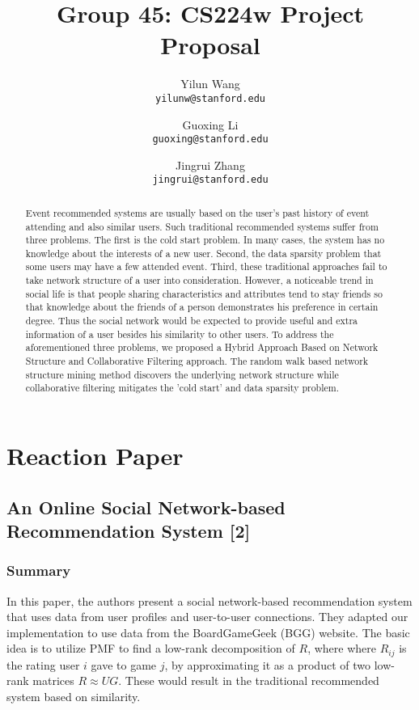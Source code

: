 \documentclass{article}
\begin{document}
\title{Group 45: CS224w Project Proposal}
\author{Yilun Wang\\
\texttt{yilunw@stanford.edu}
 \and Guoxing Li\\
\texttt{guoxing@stanford.edu}
 \and Jingrui Zhang\\
 \texttt{jingrui@stanford.edu}}
\maketitle


\begin{abstract}

Event recommended systems are usually based on the user’s past history of event attending and also similar users. Such traditional recommended systems suffer from three problems. The first is the cold start problem. In many cases, the system has no knowledge about the interests of a new user. Second, the data sparsity problem that some users may have a few attended event. Third, these traditional approaches fail to take network structure of a user into consideration. However, a noticeable trend in social life is that people sharing characteristics and attributes tend to stay friends so that knowledge about the friends of a person demonstrates his preference in certain degree. Thus the social network would be expected to provide useful and extra information of a user besides his similarity to other users. To address the aforementioned three problems, we proposed a Hybrid Approach Based on Network Structure and Collaborative Filtering approach. The random walk based network structure mining method discovers the underlying network structure while collaborative filtering mitigates the 'cold start' and data sparsity problem. 

\end{abstract}

\section{Reaction Paper}
\subsection{An Online Social Network-based Recommendation System [2]}

\subsubsection{Summary}
In this paper, the authors present a social network-based recommendation system that uses data from user profiles and user-to-user connections. They adapted our implementation to use data from the BoardGameGeek (BGG) website. 
The basic idea is to utilize PMF to find a low-rank decomposition of $R$, where where $R_{ij}$ is the rating user $i$ gave to game $j$, by approximating it as a product of two low-rank matrices $R\approx UG$. These would result in the traditional recommended system based on similarity.
\end{document}
